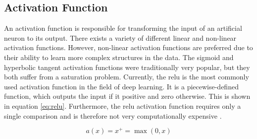 \subsection{Activation Function}
\label{subsec:theoretical_background:ann:activation_function}

An activation function is responsible for transforming the input of an artificial neuron to its output.
There exists a variety of different linear and non-linear activation functions.
However, non-linear activation functions are preferred due to their ability to learn more complex structures in the data.
The sigmoid and hyperbolic tangent activation functions were traditionally very popular, but they both suffer from a saturation problem.
Currently, the \acrfull{relu} is the most commonly used activation function in the field of deep learning.
It is a piecewise-defined function, which outputs the input if it positive and zero otherwise.
This is shown in equation \ref{eq:relu}.
Furthermore, the \acrshort{relu} activation function requires only a single comparison and is therefore not very computationally expensive \cite{relu}.

\begin{equation}
  a(x) = x^+ = \max(0, x)
  \label{eq:relu}
\end{equation}

